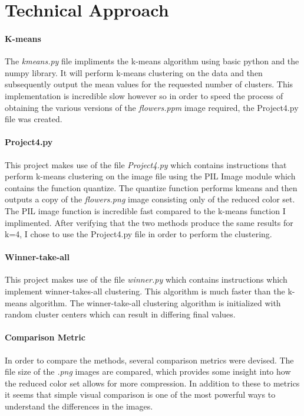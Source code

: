 \documentclass{article}
\begin{document}
\section*{Technical Approach}
\paragraph{K-means} 
The \textit{kmeans.py} file impliments the k-means algorithm using basic
python and the numpy library. It will perform k-means clustering on the 
data and then subsequently output the mean values for the requested number
of clusters. This implementation is incredible slow however so in order to
speed the process of obtaining the various versions of the \textit{flowers.ppm}
image required, the Project4.py file was created. 

\paragraph{Project4.py}
This project makes use of the file \textit{Project4.py} which contains 
instructions that perform k-means clustering on the image file using 
the PIL Image module which contains the function quantize. The quantize
function performs kmeans and then outputs a copy of the \textit{flowers.png} 
image consisting only of the reduced color set. The PIL image function is 
incredible fast compared to the k-means function I implimented. After verifying
that the two methods produce the same results for k=4, I chose to use the 
Project4.py file in order to perform the clustering.

\paragraph{Winner-take-all}
This project makes use of the file \textit{winner.py} which contains instructions
which implement winner-takes-all clustering. This algorithm is much faster than the
k-means algorithm. The winner-take-all clustering algorithm is initialized with random
cluster centers which can result in differing final values.

\paragraph{Comparison Metric}
In order to compare the methods, several comparison metrics were devised. 
The file size of the \textit{.png} images are compared, which provides some
insight into how the reduced color set allows for more compression. In addition
to these to metrics it seems that simple visual comparison is one of the most
powerful ways to understand the differences in the images.
\end{document}
